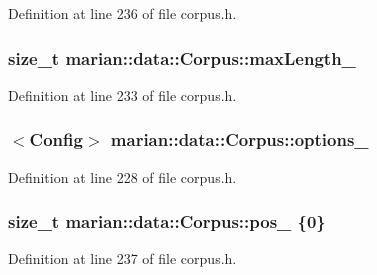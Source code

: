 Definition at line 236 of file corpus.\+h.

\subsubsection[{\texorpdfstring{max\+Length\+\_\+}{maxLength_}}]{\setlength{\rightskip}{0pt plus 5cm}size\+\_\+t marian\+::data\+::\+Corpus\+::max\+Length\+\_\+\hspace{0.3cm}{\ttfamily [private]}}\hypertarget{classmarian_1_1data_1_1Corpus_a319aa74a24b0f7e865defbb17db817fe}{}\label{classmarian_1_1data_1_1Corpus_a319aa74a24b0f7e865defbb17db817fe}


Definition at line 233 of file corpus.\+h.

\subsubsection[{\texorpdfstring{options\+\_\+}{options_}}]{$<${\bf Config}$>$ marian\+::data\+::\+Corpus\+::options\+\_\+\hspace{0.3cm}{\ttfamily [private]}}\hypertarget{classmarian_1_1data_1_1Corpus_aafc430571f253aec977c03bdc4fe0987}{}\label{classmarian_1_1data_1_1Corpus_aafc430571f253aec977c03bdc4fe0987}


Definition at line 228 of file corpus.\+h.

\subsubsection[{\texorpdfstring{pos\+\_\+}{pos_}}]{\setlength{\rightskip}{0pt plus 5cm}size\+\_\+t marian\+::data\+::\+Corpus\+::pos\+\_\+ \{0\}\hspace{0.3cm}{\ttfamily [private]}}\hypertarget{classmarian_1_1data_1_1Corpus_a71f13714f2aba56a3784f4416656dcce}{}\label{classmarian_1_1data_1_1Corpus_a71f13714f2aba56a3784f4416656dcce}


Definition at line 237 of file corpus.\+h.

